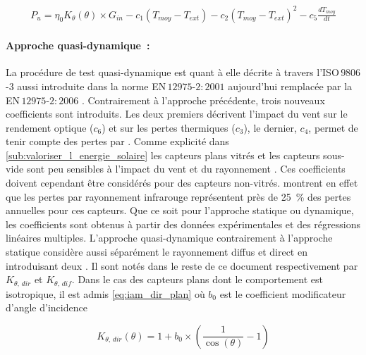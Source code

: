 \begin{equation}\label{eq:instantanee_complete}
    \begin{aligned}
        P_{u} = \eta_{0} K_{\theta}(\theta) \times G_{in} - c_{1} (T_{moy} - T_{ext}) - c_{2} (T_{moy}
                - T_{ext})^{2} - c_{5}\frac{dT_{moy}}{dt}
    \end{aligned}
\end{equation}


\paragraph{Approche quasi-dynamique~:} %
\label{par:approche_quasi_dynamique}
La procédure de test quasi-dynamique est quant à elle décrite à travers l’ISO\,$9806$-$3$
aussi introduite dans la norme EN\,$12975$-$2:2001$ \parencite{EN1297522001} aujourd’hui
remplacée par la EN\,$12975$-$2:2006$ \parencite{EN1297522006}.
Contrairement à l’approche précédente, trois nouveaux coefficients sont introduits.
Les deux premiers décrivent l’impact du vent sur le rendement optique ($c_{6}$) et sur
les pertes thermiques ($c_{3}$), le dernier, $c_{4}$, permet de tenir compte des pertes
par . Comme explicité dans \ref{sub:valoriser_l_energie_solaire}
les capteurs plans vitrés et les capteurs sous-vide sont peu sensibles à l’impact du
vent et du rayonnement . Ces coefficients doivent cependant être considérés
pour des capteurs non-vitrés. \textcite{Hunn197733} montrent en effet que les pertes
par rayonnement infrarouge représentent près de \SI{25}{\percent} des pertes annuelles
pour ces capteurs. Que ce soit pour l’approche statique ou dynamique, les coefficients
sont obtenus à partir des données expérimentales et des régressions linéaires multiples.
L’approche quasi-dynamique contrairement à l’approche statique considère aussi séparément
le rayonnement diffus et direct en introduisant deux . Il sont notés dans le reste
de ce document respectivement par $K_{\theta,\,dir}$ et $K_{\theta,\,dif}$.
Dans le cas des capteurs plans dont le comportement est
isotropique, il est admis \eqref{eq:iam_dir_plan} où $b_{0}$ est le coefficient
modificateur d’angle d’incidence \parencite{Zambolin20101382}

\begin{equation}\label{eq:iam_dir_plan}
    K_{\theta,\,dir} (\theta) = 1 + b_{0} \times \left(\frac{1}{\cos(\theta)} - 1\right)
\end{equation}

